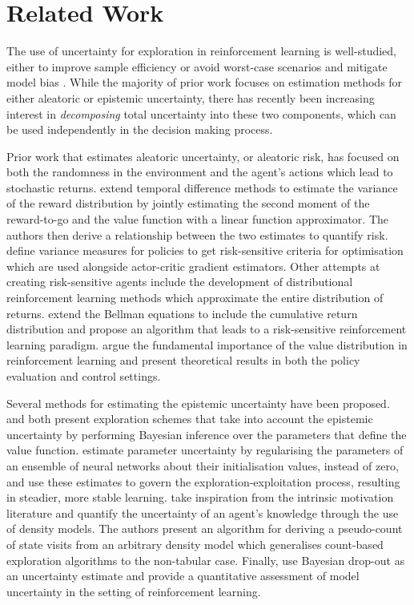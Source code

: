 \section{Related Work} %
\label{S:related-work}
The use of uncertainty for exploration in reinforcement learning is well-studied, either to improve sample efficiency \citep{schneider1997exploiting} \citep{jung2010gaussian} \citep{deisenroth2011pilco} or avoid worst-case scenarios and mitigate model bias \citep{bagnell2001solving} \citep{nilim2005robust} \citep{kahn2017uncertainty} \citep{deisenroth2013gaussian}. While the majority of prior work focuses on estimation methods for either aleatoric or epistemic uncertainty, there has recently been increasing interest in \textit{decomposing} total uncertainty into these two components, which can be used independently in the decision making process.

Prior work that estimates aleatoric uncertainty, or aleatoric risk, has focused on both the randomness in the environment and the agent's actions which lead to stochastic returns. \citet{tamar2016learning} extend temporal difference methods to estimate the variance of the reward distribution by jointly estimating the second moment of the reward-to-go and the value function with a linear function approximator. The authors then derive a relationship between the two estimates to quantify risk. \citet{prashanth2013actor} define variance measures for policies to get risk-sensitive criteria for optimisation which are used alongside actor-critic gradient estimators. Other attempts at creating risk-sensitive agents include the development of distributional reinforcement learning methods which approximate the entire distribution of returns. \citet{morimura2010nonparametric} extend the Bellman equations to include the cumulative return distribution and propose an algorithm that leads to a risk-sensitive reinforcement learning paradigm. \citet{bellemare2017distributional} argue the fundamental importance of the value distribution in reinforcement learning and present theoretical results in both the policy evaluation and control settings. 

Several methods for estimating the epistemic uncertainty have been proposed. \citet{azizzadenesheli2018efficient} and \citet{lipton2018bbq} both present exploration schemes that take into account the epistemic uncertainty by performing Bayesian inference over the parameters that define the value function. \citet{pearce2018bayesian}   estimate parameter uncertainty by regularising the parameters of an ensemble of neural networks about their initialisation values, instead of zero,  and use these estimates to govern the exploration-exploitation process, resulting in steadier, more stable learning. \citet{bellemare2016unifying} take inspiration from the intrinsic motivation literature and quantify the uncertainty of an agent's knowledge through the use of density models. The authors present an algorithm for deriving a pseudo-count of state visits from an arbitrary density model which generalises count-based exploration algorithms to the non-tabular case. Finally, \citet{gal2016dropout} use Bayesian drop-out as an uncertainty estimate and provide a quantitative assessment of model uncertainty in the setting of reinforcement learning.

